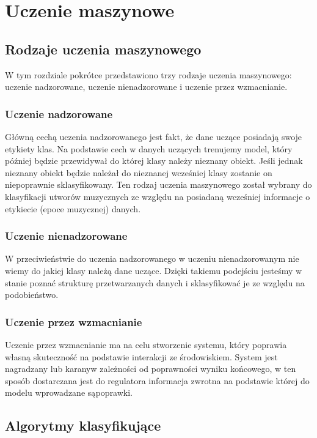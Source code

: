 \documentclass[printmode, eng]{mgr}
\newcommand\tab[1][1cm]{\hspace*{#1}}
\begin{document}
\chapter{Uczenie maszynowe}
\section{Rodzaje uczenia maszynowego}
\tab W tym rozdziale pokrótce przedstawiono trzy rodzaje uczenia maszynowego: uczenie nadzorowane, uczenie nienadzorowane i uczenie przez wzmacnianie.
\subsection{Uczenie nadzorowane}
\tab Główną cechą uczenia nadzorowanego jest fakt, że dane uczące posiadają swoje etykiety klas. Na podstawie cech w danych uczących trenujemy model, który później będzie przewidywał do której klasy należy nieznany obiekt. Jeśli jednak nieznany obiekt będzie należał do nieznanej wcześniej klasy zostanie on niepoprawnie sklasyfikowany.
\tab Ten rodzaj uczenia maszynowego został wybrany do klasyfikacji utworów muzycznych ze względu na posiadaną wcześniej informacje o etykiecie (epoce muzycznej) danych.
\subsection{Uczenie nienadzorowane}
\tab W przeciwieństwie do uczenia nadzorowanego w uczeniu nienadzorowanym nie wiemy do jakiej klasy należą dane uczące. Dzięki takiemu podejściu jesteśmy w stanie poznać strukturę przetwarzanych danych i sklasyfikować je ze względu na podobieństwo. 
\subsection{Uczenie przez wzmacnianie}
\tab Uczenie przez wzmacnianie ma na celu stworzenie systemu, który poprawia własną skuteczność na podstawie interakcji ze środowiskiem. System jest nagradzany lub karany\linebreak w zależności od poprawności wyniku końcowego, w ten sposób dostarczana jest do regulatora informacja zwrotna na podstawie której do modelu wprowadzane są\linebreak poprawki.
\section{Algorytmy klasyfikujące}
\end{document}
